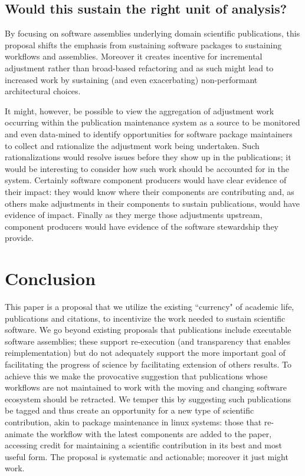 \documentclass{sigchi}
\begin{document}
\subsection{Would this sustain the right unit of analysis?}

By focusing on software assemblies underlying domain scientific publications, this proposal shifts the emphasis from sustaining software packages to sustaining workflows and assemblies. Moreover it creates incentive for incremental adjustment rather than broad-based refactoring and as such might lead to increased work by sustaining (and even exacerbating) non-performant architectural choices.

It might, however, be possible to view the aggregation of adjustment work occurring within the publication maintenance system as a source to be monitored and even data-mined to identify opportunities for software package maintainers to collect and rationalize the adjustment work being undertaken. Such rationalizations would resolve issues before they show up in the publications; it would be interesting to consider how such work should be accounted for in the system. Certainly software component producers would have clear evidence of their impact: they would know where their components are contributing and, as others make adjustments in their components to sustain publications, would have evidence of impact. Finally as they merge those adjustments upstream, component producers would have evidence of the software stewardship they provide.

\section{Conclusion}

This paper is a proposal that we utilize the existing ``currency" of academic life, publications and citations, to incentivize the work needed to sustain scientific software. We go beyond existing proposals that publications include executable software assemblies; these support re-execution (and transparency that enables reimplementation) but do not adequately support the more important goal of facilitating the progress of science by facilitating extension of others results.  To achieve this we make the provocative suggestion that publications whose workflows are not maintained to work with the moving and changing software ecosystem should be retracted. We temper this by suggesting such publications be tagged and thus create an opportunity for a new type of scientific contribution, akin to package maintenance in linux systems: those that re-animate the workflow with the latest components are added to the paper, accessing credit for maintaining a scientific contribution in its best and most useful form. The proposal is systematic and actionable; moreover it just might work.
\end{document}
